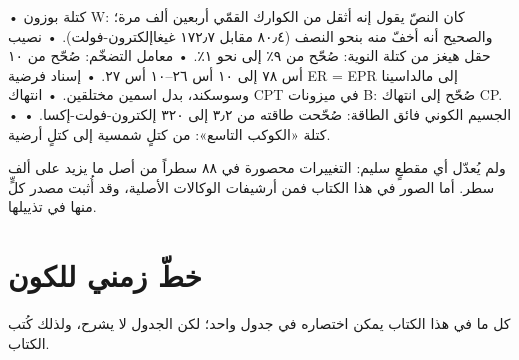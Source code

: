 \documentclass[12pt,a4paper,openany]{book}
\begin{document}
• كتلة بوزون W: كان النصّ يقول إنه أثقل من الكوارك القمّي أربعين ألف مرة؛ والصحيح أنه أخفّ منه بنحو النصف (٨٠٫٤ مقابل ١٧٢٫٧ غيغاإلكترون-فولت).
• نصيب حقل هيغز من كتلة النوية: صُحّح من ٩٪ إلى نحو ١٪.
• معامل التضخّم: صُحّح من ١٠ أس ٧٨ إلى ١٠ أس ٢٦–١٠ أس ٢٧.
• إسناد فرضية ER = EPR إلى مالداسينا وسوسكند، بدل اسمين مختلقين.
• انتهاك CPT في ميزونات B: صُحّح إلى انتهاك CP.
• الجسيم الكوني فائق الطاقة: صُحّحت طاقته من ٣٫٢ إلى ٣٢٠ إلكترون-فولت-إكسا.
• كتلة «الكوكب التاسع»: من كتلٍ شمسية إلى كتلٍ أرضية.


ولم يُعدّل أي مقطعٍ سليم: التغييرات محصورة في ٨٨ سطراً من أصل ما يزيد على ألف سطر. أما الصور في هذا الكتاب فمن أرشيفات الوكالات الأصلية، وقد أُثبت مصدر كلٍّ منها في تذييلها.


\chapter*{خطّ زمني للكون}\n
{}\n\n
كل ما في هذا الكتاب يمكن اختصاره في جدول واحد؛ لكن الجدول لا يشرح، ولذلك كُتب الكتاب.
\end{document}
